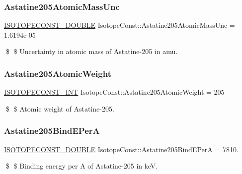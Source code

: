 \subsubsection{\texorpdfstring{Astatine205\+Atomic\+Mass\+Unc}{Astatine205AtomicMassUnc}}
{\footnotesize\ttfamily \mbox{\hyperlink{group___isotope_const-_macros_ga8f45a7272ce02c0b4c65c44636ed719a}{I\+S\+O\+T\+O\+P\+E\+C\+O\+N\+S\+T\+\_\+\+D\+O\+U\+B\+LE}} Isotope\+Const\+::\+Astatine205\+Atomic\+Mass\+Unc = 1.\+6194e-\/05}

\$ \$ Uncertainty in atomic mass of Astatine-\/205 in amu. \mbox{\label{group___isotope_const-_astatine-_at205_gab33d3237008fa156902f1f121f609fa8}} 
\subsubsection{\texorpdfstring{Astatine205\+Atomic\+Weight}{Astatine205AtomicWeight}}
{\footnotesize\ttfamily \mbox{\hyperlink{group___isotope_const-_macros_ga5f18360b3e99483a35c32d789e62621c}{I\+S\+O\+T\+O\+P\+E\+C\+O\+N\+S\+T\+\_\+\+I\+NT}} Isotope\+Const\+::\+Astatine205\+Atomic\+Weight = 205}

\$ \$ Atomic weight of Astatine-\/205. \mbox{\label{group___isotope_const-_astatine-_at205_ga81e8b0374ea34f3901e0ab1afdee5b6d}} 
\subsubsection{\texorpdfstring{Astatine205\+Bind\+E\+PerA}{Astatine205BindEPerA}}
{\footnotesize\ttfamily \mbox{\hyperlink{group___isotope_const-_macros_ga8f45a7272ce02c0b4c65c44636ed719a}{I\+S\+O\+T\+O\+P\+E\+C\+O\+N\+S\+T\+\_\+\+D\+O\+U\+B\+LE}} Isotope\+Const\+::\+Astatine205\+Bind\+E\+PerA = 7810.}

\$ \$ Binding energy per A of Astatine-\/205 in keV. \mbox{\label{group___isotope_const-_astatine-_at205_ga1bdee84815ba87487c6eeb2a819a05eb}} 
